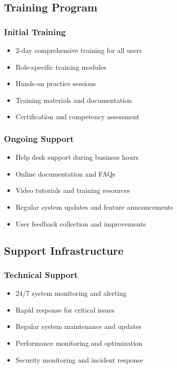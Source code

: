 \documentclass[12pt,a4paper]{article}
\begin{document}
\subsection{Training Program}

\subsubsection{Initial Training}
\begin{itemize}
    \item 2-day comprehensive training for all users
    \item Role-specific training modules
    \item Hands-on practice sessions
    \item Training materials and documentation
    \item Certification and competency assessment
\end{itemize}

\subsubsection{Ongoing Support}
\begin{itemize}
    \item Help desk support during business hours
    \item Online documentation and FAQs
    \item Video tutorials and training resources
    \item Regular system updates and feature announcements
    \item User feedback collection and improvements
\end{itemize}

\subsection{Support Infrastructure}

\subsubsection{Technical Support}
\begin{itemize}
    \item 24/7 system monitoring and alerting
    \item Rapid response for critical issues
    \item Regular system maintenance and updates
    \item Performance monitoring and optimization
    \item Security monitoring and incident response
\end{itemize}
\end{document}
